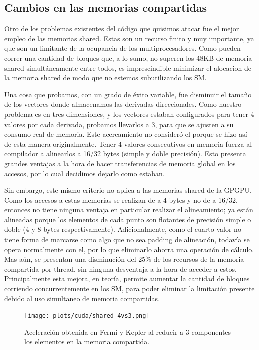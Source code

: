 \subsection{Cambios en las memorias compartidas}
Otro de los problemas existentes del c\'odigo que quisimos atacar fue el mejor empleo de las
memorias shared. Estas son un recurso finito y muy importante, ya que son un limitante de
la ocupancia de los multiprocesadores. Como pueden correr una cantidad de bloques que, a lo sumo,
no superen los 48KB de memoria shared simult\'aneamente entre todos, es imprescindible minimizar el
alocacion de la memoria shared de modo que no estemos subutilizando los SM.

Una cosa que probamos, con un grado de \'exito variable, fue disminuir el tama\~no de los vectores
donde almacenamos las derivadas direccionales. Como nuestro problema es en tres dimensiones,
y los vectores estaban configurados para tener 4 valores por cada derivada, probamos llevarlos a
3, para que se ajusten a su consumo real de memoria. Este acercamiento no consider\'o el porque
se hizo as\'i de esta manera originalmente. Tener 4 valores consecutivos en memoria fuerza
al compilador a alinearlos a 16/32 bytes (simple y doble precisi\'on).
Esto presenta grandes ventajas a la hora de hacer transferencias de memoria global en los accesos,
por lo cual decidimos dejarlo como estaban.

Sin embargo, este mismo criterio no aplica a las memorias shared de la GPGPU. Como los accesos
a estas memorias se realizan de a 4 bytes y no de a 16/32, entonces no tiene ninguna ventaja
en particular realizar el alineamiento; ya est\'an alineadas porque los elementos de cada punto
son flotantes de precisi\'on simple o doble (4 y 8 bytes respectivamente). Adicionalmente, como el
cuarto valor no tiene forma de marcarse como algo que no sea padding de alineaci\'on, todav\'ia se
opera normalmente con el, por lo que eliminarlo ahorra una operaci\'on de c\'alculo. Mas a\'un,
se presentan una disminuci\'on del 25\% de los recursos de la memoria compartida por thread,
sin ninguna desventaja a la hora de acceder a estos. Principalmente esta mejora, en teor\'ia, permite
aumentar la cantidad de bloques corriendo concurrentemente en los SM, para poder eliminar
la limitaci\'on presente debido al uso simultaneo de memoria compartidas.

\begin{figure}[htbp]
   \centering
   \texttt{[image: plots/cuda/shared-4vs3.png]}
   \caption{Aceleraci\'on obtenida en Fermi y Kepler al reducir a 3 componentes los
   elementos en la memoria compartida.}
   \label{plt:shared4vs3}
\end{figure}


